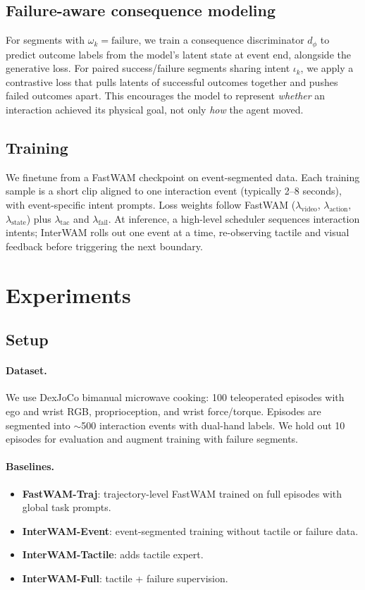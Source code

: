 \documentclass{article}
\newcommand{\fix}{\marginpar{FIX}}
\begin{document}
\subsection{Failure-aware consequence modeling}
For segments with $\omega_k = \text{failure}$, we train a consequence discriminator $d_\phi$ to predict outcome labels from the model's latent state at event end, alongside the generative loss.
For paired success/failure segments sharing intent $\iota_k$, we apply a contrastive loss that pulls latents of successful outcomes together and pushes failed outcomes apart.
This encourages the model to represent \emph{whether} an interaction achieved its physical goal, not only \emph{how} the agent moved.

\subsection{Training}
We finetune from a FastWAM checkpoint on event-segmented data.
Each training sample is a short clip aligned to one interaction event (typically 2--8 seconds), with event-specific intent prompts.
Loss weights follow FastWAM ($\lambda_{\text{video}}$, $\lambda_{\text{action}}$, $\lambda_{\text{state}}$) plus $\lambda_{\text{tac}}$ and $\lambda_{\text{fail}}$.
At inference, a high-level scheduler sequences interaction intents; InterWAM rolls out one event at a time, re-observing tactile and visual feedback before triggering the next boundary.

\section{Experiments}
\label{sec:experiments}

\subsection{Setup}

\paragraph{Dataset.}
We use DexJoCo bimanual microwave cooking: 100 teleoperated episodes with ego and wrist RGB, proprioception, and wrist force/torque.
Episodes are segmented into $\sim$500 interaction events with dual-hand labels.
We hold out 10 episodes for evaluation and augment training with \fix{XX} failure segments.

\paragraph{Baselines.}
\begin{itemize}
    \item \textbf{FastWAM-Traj}: trajectory-level FastWAM trained on full episodes with global task prompts.
    \item \textbf{InterWAM-Event}: event-segmented training without tactile or failure data.
    \item \textbf{InterWAM-Tactile}: adds tactile expert.
    \item \textbf{InterWAM-Full}: tactile + failure supervision.
\end{itemize}
\end{document}
